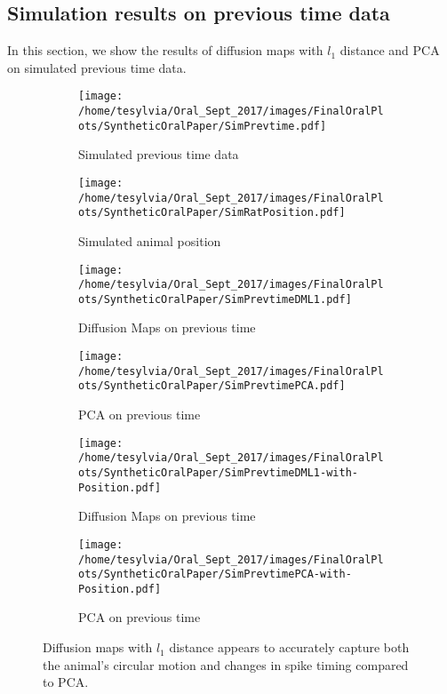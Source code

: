 \newpage



\subsection{Simulation results on previous time data}
In this section, we show the results of diffusion maps with $l_{1}$ distance 
and PCA on simulated previous time data. 

\begin{figure}[h!]
\centering
\begin{subfigure}[b]{.45\linewidth}
\texttt{[image: /home/tesylvia/Oral\_Sept\_2017/images/FinalOralPlots/SyntheticOralPaper/SimPrevtime.pdf]}
\caption{Simulated previous time data}\label{fig:SimPrevtime}
\end{subfigure}
\begin{subfigure}[b]{.45\linewidth}
\texttt{[image: /home/tesylvia/Oral\_Sept\_2017/images/FinalOralPlots/SyntheticOralPaper/SimRatPosition.pdf]}
\caption{Simulated animal position}\label{fig:SimPosition}
\end{subfigure}
\begin{subfigure}[b]{.45\linewidth}
\texttt{[image: /home/tesylvia/Oral\_Sept\_2017/images/FinalOralPlots/SyntheticOralPaper/SimPrevtimeDML1.pdf]}
\caption{Diffusion Maps on previous time}\label{fig:SimPrevtimeDML1-2D}
\end{subfigure}
\begin{subfigure}[b]{.45\linewidth}
\texttt{[image: /home/tesylvia/Oral\_Sept\_2017/images/FinalOralPlots/SyntheticOralPaper/SimPrevtimePCA.pdf]}
\caption{PCA on  previous time}\label{fig:SimPrevtimePCA-2D}
\end{subfigure}
\begin{subfigure}[b]{.45\linewidth}
\texttt{[image: /home/tesylvia/Oral\_Sept\_2017/images/FinalOralPlots/SyntheticOralPaper/SimPrevtimeDML1-with-Position.pdf]}
\caption{Diffusion Maps on previous time}\label{fig:SimPrevtimeDML1-3D}
\end{subfigure}
\begin{subfigure}[b]{.45\linewidth}
\texttt{[image: /home/tesylvia/Oral\_Sept\_2017/images/FinalOralPlots/SyntheticOralPaper/SimPrevtimePCA-with-Position.pdf]}
\caption{PCA on previous time}\label{fig:SimPrevtimePCA-3D}
\end{subfigure}
\caption{Diffusion maps  with $l_{1}$ distance appears to accurately capture both the animal's circular motion and changes in spike timing compared to PCA.}
\label{fig:Output-on-SimPrevtime}
\end{figure}
